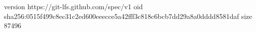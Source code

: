 version https://git-lfs.github.com/spec/v1
oid sha256:0515f499c8ec31c2ed600eeecce5a42fff3c818c6bcb7dd29a8a0dddd8581daf
size 87496
